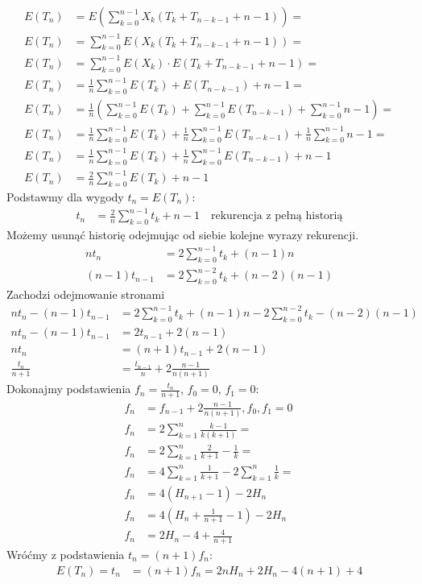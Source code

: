 \documentclass{article}
\numberwithin{equation}{subsection}
\begin{document}
\begin{align}
    E(T_n) &= E\left(\sum_{k=0}^{n-1} X_k(T_k+T_{n-k-1} + n-1)\right)=\\
    E(T_n) &= \sum_{k=0}^{n-1} E\left(X_k(T_k+T_{n-k-1} + n-1)\right)=\\
    E(T_n) &= \sum_{k=0}^{n-1} E\left(X_k\right) \cdot E(T_k+T_{n-k-1} + n-1)=\\
    E(T_n) &= \frac{1}{n} \sum_{k=0}^{n-1} E(T_k) + E(T_{n-k-1}) + n-1=\\
    E(T_n) &= \frac{1}{n} \left(\sum_{k=0}^{n-1} E(T_k) + \sum_{k=0}^{n-1} E(T_{n-k-1}) + \sum_{k=0}^{n-1} n-1\right)=\\
    E(T_n) &= \frac{1}{n} \sum_{k=0}^{n-1} E(T_k) + \frac{1}{n} \sum_{k=0}^{n-1} E(T_{n-k-1}) + \frac{1}{n} \sum_{k=0}^{n-1} n-1 = \\
    E(T_n) &= \frac{1}{n} \sum_{k=0}^{n-1} E(T_k) + \frac{1}{n} \sum_{k=0}^{n-1} E(T_{n-k-1}) + n - 1\\
    E(T_n) &= \frac{2}{n} \sum_{k=0}^{n-1} E(T_k) + n - 1
\end{align}
Podstawmy dla wygody $t_n=E(T_n)$:
\begin{align}
    t_n &= \frac{2}{n} \sum_{k=0}^{n-1} t_k + n - 1 \quad \text{rekurencja z pełną historią}
\end{align}
Możemy usunąć historię odejmując od siebie kolejne wyrazy rekurencji.
\begin{align}
    n t_n &= 2 \sum_{k=0}^{n-1} t_k + (n-1)n\\
    (n-1) t_{n-1} &= 2 \sum_{k=0}^{n-2} t_k + (n-2)(n-1)
\end{align}
Zachodzi odejmowanie stronami
\begin{align}
    n t_n - (n-1) t_{n-1} &= 2 \sum_{k=0}^{n-1} t_k + (n-1)n - 2 \sum_{k=0}^{n-2} t_k - (n-2)(n-1)\\
    n t_n - (n-1) t_{n-1} &= 2 t_{n-1} + 2 (n-1)\\
    n t_n &= (n+1) t_{n-1} + 2(n-1)\\
    \frac{t_n}{n+1} &= \frac{t_{n-1}}{n} + 2\frac{n-1}{n(n+1)}
\end{align}
Dokonajmy podstawienia $f_n=\frac{t_n}{n+1}$, $f_0=0$, $f_1=0$:
\begin{align}
    f_n &= f_{n-1} + 2\frac{n-1}{n(n+1)}, f_0, f_1 = 0\\
    f_n &= 2 \sum_{k=1}^{n} \frac{k-1}{k(k+1)} =\\
    f_n &= 2 \sum_{k=1}^{n} \frac{2}{k+1} - \frac{1}{k}=\\
    f_n &= 4 \sum_{k=1}^{n} \frac{1}{k+1} - 2\sum_{k=1}^{n} \frac{1}{k}=\\
    f_n &= 4 (H_{n+1} - 1) - 2 H_n\\
    f_n &= 4 \left(H_{n} + \frac{1}{n+1} - 1\right) - 2H_n\\
    f_n &= 2H_{n} - 4 + \frac{4}{n+1}
\end{align}
Wróćmy z podstawienia $t_n = (n+1)f_n$:
\begin{align}
    E(T_n) = t_n &= (n+1)f_n = 2nH_n + 2H_n - 4(n+1) + 4
\end{align}
\end{document}
